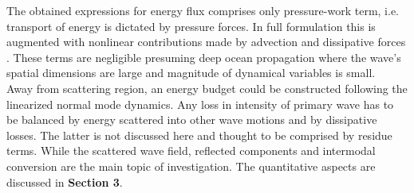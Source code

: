 \documentclass[12pt]{article}
\begin{document}
The obtained expressions for energy flux comprises only pressure-work term, i.e. transport of 
energy is dictated by pressure forces. In full formulation this is augmented with nonlinear 
contributions made by advection and dissipative forces \citep{gill2016atmosphere}. These terms 
are negligible presuming deep ocean propagation where the wave's spatial dimensions are large and 
magnitude of dynamical variables is small.\\
Away from scattering region, an energy budget could be constructed following the linearized normal 
mode dynamics. Any loss in intensity of primary wave has to be balanced by energy scattered into 
other 
wave motions and by dissipative losses. The latter is not discussed here and thought to be 
comprised by residue terms. While the scattered wave field, reflected components and intermodal 
conversion are the main topic of investigation. The quantitative aspects are discussed in 
\textbf{Section 3}.\\
\end{document}
